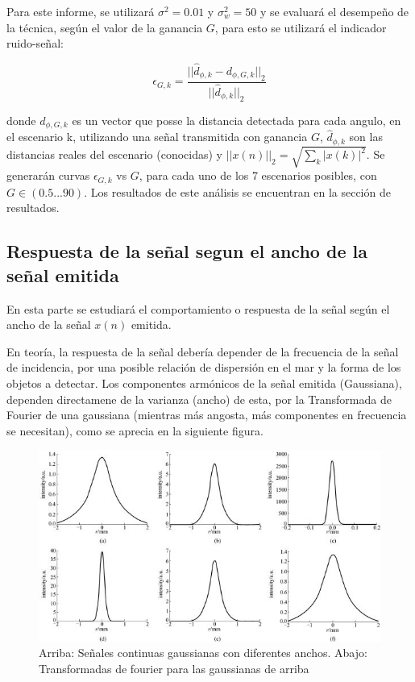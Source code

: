 \documentclass[letterpaper,11pt]{article}
\begin{document}
Para este informe, se utilizará $\sigma^2 = 0.01$ y $\sigma_{w}^2 = 50$ y se evaluará el desempeño de la técnica, según el valor de la ganancia $G$, para esto se utilizará el indicador ruido-señal:

\begin{equation}
\epsilon_{G,k} = \frac{||\hat{d}_{\phi,k} - d_{\phi,G,k}||_{2}}{||\hat{d}_{\phi,k}||_{2}}
\end{equation}

donde $d_{\phi,G,k}$ es un vector que posse la distancia detectada para cada angulo, en el escenario k, utilizando una señal transmitida con ganancia $G$, $\hat{d}_{\phi,k}$ son las distancias reales del escenario (conocidas) y $||x(n)||_{2} = \sqrt{\sum_{k} |x(k)|^{2}}$. Se generarán curvas $\epsilon_{G,k}$ vs $G$, para cada uno de los 7 escenarios posibles, con $G \in (0.5...90)$. Los resultados de este análisis se encuentran en la sección de resultados.


\subsection{Respuesta de la señal segun el ancho de la señal emitida}

En esta parte se estudiará el comportamiento o respuesta de la señal según el ancho de la señal $x(n)$ emitida.\par

En teoría, la respuesta de la señal debería depender de la frecuencia de la señal de incidencia, por una posible relación de dispersión en el mar y la forma de los objetos a detectar. Los componentes armónicos de la señal emitida (Gaussiana), dependen directamene de la varianza (ancho) de esta, por la Transformada de Fourier de una gaussiana (mientras más angosta, más componentes en frecuencia se necesitan), como se aprecia en la siguiente figura.


\begin{figure}[H]
\centering
\includegraphics[width=1.0\textwidth]{img/parte_d/fourier.jpg}
\caption{Arriba: Señales continuas gaussianas con diferentes anchos. Abajo: Transformadas de fourier para las gaussianas de arriba}
\label{correlacion}
\end{figure}
\end{document}
